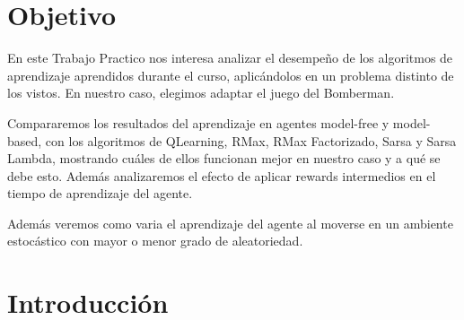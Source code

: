 \documentclass[a4paper,spanish] {article}
\begin{document}
\pagestyle{headings}



\newpage




\maketitle

		
\newpage
\tableofcontents
\newpage

\section{Objetivo}
	En  este Trabajo Practico nos interesa analizar el desempeño de los algoritmos de aprendizaje aprendidos durante el curso,  aplic\'andolos  en un problema distinto de los vistos. En nuestro caso, elegimos adaptar el juego del Bomberman. 
	
	Compararemos los resultados del aprendizaje en agentes model-free y model-based, con los algoritmos de QLearning, RMax, RMax Factorizado, Sarsa y Sarsa Lambda, mostrando cu\'ales de ellos funcionan mejor en nuestro caso y a qu\'e se debe esto. Adem\'as analizaremos el efecto de aplicar rewards intermedios en el tiempo de aprendizaje del agente.
	
	Adem\'as veremos como varia el aprendizaje del agente al moverse en un ambiente estoc\'astico con mayor o menor grado de aleatoriedad.

\section{Introducci\'on}
\end{document}
